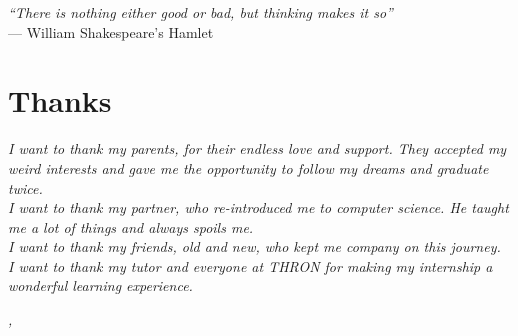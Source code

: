 
\cleardoublepage
{}
{}

\begin{flushright}{
	\slshape    
	``There is nothing either good or bad, but thinking makes it so'' \medskip} \\ 
	\medskip
    --- William Shakespeare's Hamlet
\end{flushright}


\bigskip

\begingroup
\let\clearpage\relax
\let\cleardoublepage\relax
\let\cleardoublepage\relax

\chapter*{Thanks}

\noindent \textit{I want to thank my parents, for their endless love and support. They accepted my weird interests and gave me the opportunity to follow my dreams and graduate twice.}\\

\noindent \textit{
I want to thank my partner, who re-introduced me to computer science. He taught me a lot of things and always spoils me.}\\

\noindent \textit{I want to thank my friends, old and new, who kept me company on this journey.}\\

\noindent \textit{I want to thank my tutor and everyone at THRON for making my internship a wonderful learning experience.}

\bigskip

\noindent\textit{\myLocation, \myTime}
\hfill \myName

\endgroup

